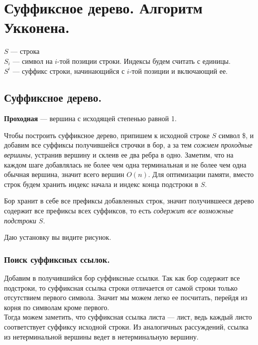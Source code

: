 \section{Суффиксное дерево. Алгоритм Укконена.}%
\label{sec:Суффиксное дерево. Алгоритм Укконена.}
$S$ --- строка \\
$S_i$ --- символ на  $i$-той позиции строки. Индексы будем считать с единицы. \\
$S^i$ --- суффикс строки, начинающийся с $i$-той позиции и включающий ее.

\subsection{Суффиксное дерево.}%
\label{sub:Суффиксное дерево.}

\begin{Def}
   \textbf{Проходная} --- вершина с исходящей степенью равной 1.
\end{Def}

Чтобы построить суффиксное дерево, припишем к исходной строке $S$ символ \$, и добавим все суффиксы получившейся строчки в бор, а за тем \textit{сожмем проходные вершины}, устранив вершину и склеив ее два ребра в одно. Заметим, что на каждом шаге добавлялась не более чем одна терминальная и не более чем одна обычная вершина, значит всего вершин $O(n)$.
Для оптимизации памяти, вместо строк будем хранить индекс начала и индекс конца подстроки в $S$.

Бор хранит в себе все префиксы добавленных строк, значит получившееся дерево содержит все префиксы всех суффиксов, то есть \textit{содержит все возможные подстроки $S$}.

\begin{example}
   Даю установку вы видите рисунок. 
\end{example}

\subsubsection{Поиск суффиксных ссылок.}
Добавим в получившийся бор суффиксные ссылки. Так как бор содержит все подстроки, то суффиксная ссылка строки отличается от самой строки только отсутствием первого символа. Значит мы можем легко ее посчитать, перейдя из корня по символам кроме первого. \\
Тогда можем заметить, что суффиксная ссылка листа --- лист, ведь каждый листо соответствует суффиксу исходной строки. Из аналогичных рассуждений, ссылка из нетерминальной вершины ведет в нетерминальную вершину. 

